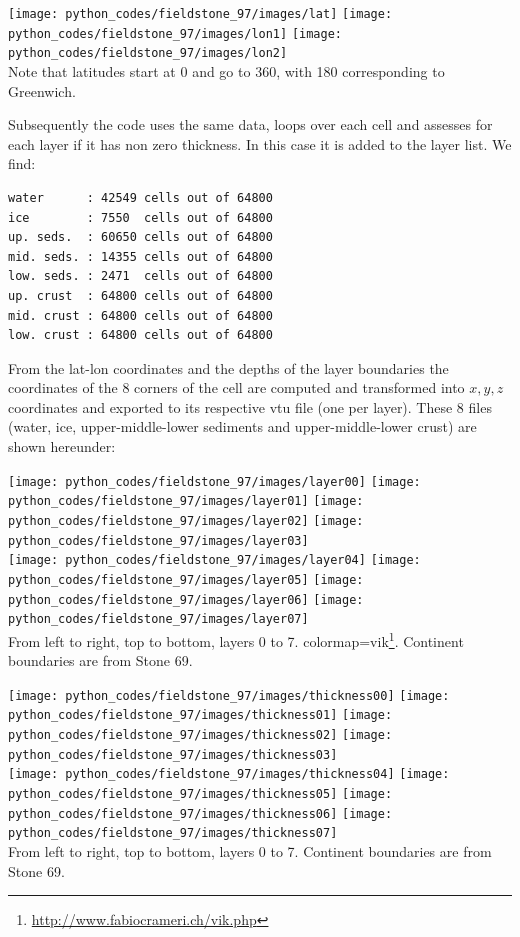 \begin{center}
\texttt{[image: python\_codes/fieldstone\_97/images/lat]}
\texttt{[image: python\_codes/fieldstone\_97/images/lon1]}
\texttt{[image: python\_codes/fieldstone\_97/images/lon2]}\\
{\captionfont Note that latitudes start at 0 and go to 360, with 180
corresponding to Greenwich.}
\end{center}



Subsequently the code uses the same data, loops over each cell and assesses 
for each layer if it has non zero thickness. In this case it is added to 
the layer list. We find:

\begin{verbatim}
water      : 42549 cells out of 64800
ice        : 7550  cells out of 64800
up. seds.  : 60650 cells out of 64800
mid. seds. : 14355 cells out of 64800
low. seds. : 2471  cells out of 64800
up. crust  : 64800 cells out of 64800
mid. crust : 64800 cells out of 64800
low. crust : 64800 cells out of 64800
\end{verbatim}

From the lat-lon coordinates and the depths of the 
layer boundaries the coordinates of the 8 corners of the cell are 
computed and transformed into $x,y,z$ coordinates and exported to its 
respective vtu file (one per layer). These 8 files 
(water, ice, upper-middle-lower sediments and upper-middle-lower crust) are 
shown hereunder:

\begin{center}
\texttt{[image: python\_codes/fieldstone\_97/images/layer00]}
\texttt{[image: python\_codes/fieldstone\_97/images/layer01]}
\texttt{[image: python\_codes/fieldstone\_97/images/layer02]}
\texttt{[image: python\_codes/fieldstone\_97/images/layer03]}\\
\texttt{[image: python\_codes/fieldstone\_97/images/layer04]}
\texttt{[image: python\_codes/fieldstone\_97/images/layer05]}
\texttt{[image: python\_codes/fieldstone\_97/images/layer06]}
\texttt{[image: python\_codes/fieldstone\_97/images/layer07]}\\
{\captionfont 
From left to right, top to bottom, layers 0 to 7.
colormap=vik\footnote{\url{http://www.fabiocrameri.ch/vik.php}}.
Continent boundaries are from Stone 69.}
\end{center}

\begin{center}
\texttt{[image: python\_codes/fieldstone\_97/images/thickness00]}
\texttt{[image: python\_codes/fieldstone\_97/images/thickness01]}
\texttt{[image: python\_codes/fieldstone\_97/images/thickness02]}
\texttt{[image: python\_codes/fieldstone\_97/images/thickness03]}\\
\texttt{[image: python\_codes/fieldstone\_97/images/thickness04]}
\texttt{[image: python\_codes/fieldstone\_97/images/thickness05]}
\texttt{[image: python\_codes/fieldstone\_97/images/thickness06]}
\texttt{[image: python\_codes/fieldstone\_97/images/thickness07]}\\
{\captionfont 
From left to right, top to bottom, layers 0 to 7.
Continent boundaries are from Stone 69.}
\end{center}



